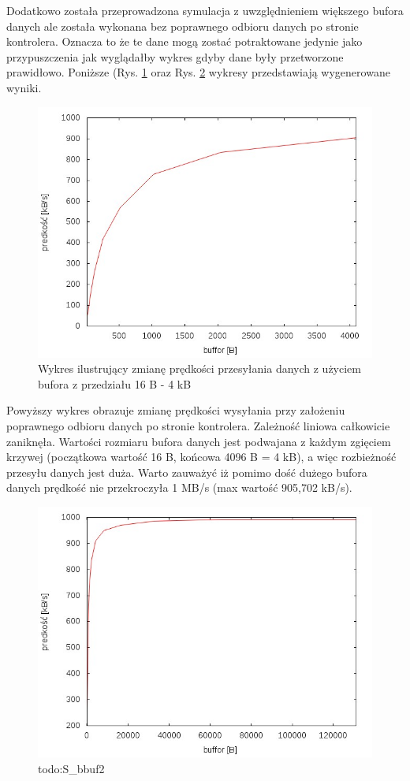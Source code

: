 \documentclass{BscUS}
\begin{document}
Dodatkowo została przeprowadzona symulacja z uwzględnieniem większego bufora danych ale została wykonana bez poprawnego odbioru danych po stronie kontrolera. Oznacza to że te dane mogą zostać potraktowane jedynie jako przypuszczenia jak wyglądałby wykres gdyby dane były przetworzone prawidłowo. Poniższe (Rys. \ref{fig:S_bbuf1} oraz Rys. \ref{fig:S_bbuf2} wykresy przedstawiają wygenerowane wyniki.

\begin{figure}[H]
{
\centering
\includegraphics[width=1\textwidth]{./img/S_bbuf1}
\caption{Wykres ilustrujący zmianę prędkości przesyłania danych z użyciem bufora z przedziału 16 B - 4 kB}
\label{fig:S_bbuf1}
}
\end{figure}

Powyższy wykres obrazuje zmianę prędkości wysyłania przy założeniu poprawnego odbioru danych po stronie kontrolera. Zależność liniowa całkowicie zaniknęła. Wartości rozmiaru bufora danych jest podwajana z każdym zgięciem krzywej (początkowa wartość 16 B, końcowa 4096 B = 4 kB), a więc rozbieżność przesyłu danych jest duża. Warto zauważyć iż pomimo dość dużego bufora danych prędkość nie przekroczyła 1 MB/s (max wartość 905,702 kB/s).
\begin{figure}[H]
{
\centering
\includegraphics[width=1\textwidth]{./img/S_bbuf2}
\caption{todo:S\_bbuf2}
\label{fig:S_bbuf2}
}
\end{figure}
\end{document}
